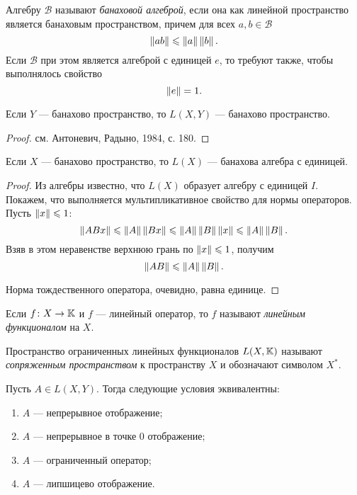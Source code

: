 \begin{definition}
    Алгебру $\mathcal B$ называют \emph{банаховой алгеброй}, если она как линейной пространство
    является банаховым пространством, причем для всех $a, b \in \mathcal B$
    \[ \left\|ab\right\| \leqslant \left\|a\right\|\left\|b\right\|. \]
    Если $\mathcal B$ при этом является алгеброй с единицей $e$, то требуют также, 
    чтобы выполнялось свойство
    \[ \left\|e\right\| = 1. \]
\end{definition}

\begin{theorem}
    Если $Y$ --- банахово пространство, то $L(X, Y)$ --- банахово
    пространство.
\end{theorem}

\begin{proof}
   см. Антоневич, Радыно, 1984, с. 180. 
\end{proof}

\begin{corollaryth}
   Если $X$ --- банахово пространство, то $L(X)$ --- банахова алгебра с единицей.
\end{corollaryth}

\begin{proof}
    Из алгебры известно, что $L(X)$ образует алгебру с единицей $I$. Покажем, что выполняется
    мультипликативное свойство для нормы операторов. Пусть $\left\|x\right\| \leqslant 1$:
    \[ \left\|ABx\right\| \leqslant \left\|A\right\|\left\|Bx\right\| \leqslant \left\|A\right\|\left\|B\right\|\left\|x\right\| \leqslant \left\|A\right\|\left\|B\right\|. \]
    Взяв в этом неравенстве верхнюю грань по $\left\|x\right\| \leqslant 1$, получим
    \[ \left\|AB\right\| \leqslant \left\|A\right\|\left\|B\right\|. \]

    Норма тождественного оператора, очевидно, равна единице.
\end{proof}

\begin{definition}
    Если $f \colon X \to \mathbb{K}$ и $f$ --- линейный оператор,
     то $f$ называют \emph{линейным функционалом} на $X$.

    Пространство ограниченных линейных функционалов $L(X, \mathbb{K})$ называют
    \emph{сопряженным пространством} к пространству $X$ и обозначают символом $X^*$.
\end{definition}

\begin{theorem}
    Пусть $A \in L(X, Y)$. Тогда следующие условия эквивалентны:
    \begin{enumerate}
        \item $A$ --- непрерывное отображение;
        \item $A$ --- непрерывное в точке $0$ отображение;
        \item $A$ --- ограниченный оператор;
        \item $A$ --- липшицево отображение.
    \end{enumerate}
\end{theorem}

